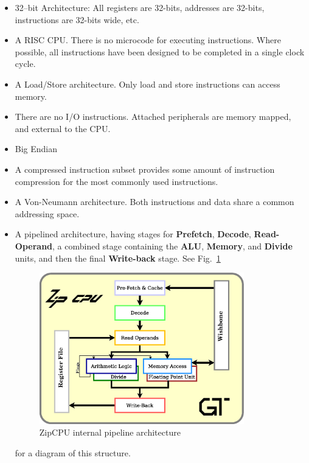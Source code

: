 \documentclass{gqtekspec}
\begin{document}
\begin{itemize}
\item 32--bit Architecture: All registers are 32-bits, addresses are 32-bits,
		instructions are 32-bits wide, etc.

\item A RISC CPU.  There is no microcode for executing instructions.
	Where possible, all instructions have been designed to be completed
	in a single clock cycle.

\item A Load/Store architecture.  Only load and store instructions
	can access memory.

\item There are no I/O instructions.  Attached peripherals are memory
	mapped, and external to the CPU.

\item Big Endian

\item A compressed instruction subset provides some amount of instruction
	compression for the most commonly used instructions.

\item A Von-Neumann architecture.  Both instructions and data share a 
	common addressing space.

\item A pipelined architecture, having stages for {\bf Prefetch},
	{\bf Decode}, {\bf Read-Operand}, a combined stage containing
	the {\bf ALU}, {\bf Memory}, and {\bf Divide} units, and then the
	final {\bf Write-back} stage.  See Fig.~\ref{fig:cpu}
\begin{figure}\begin{center}
\includegraphics[width=3.5in]{../gfx/cpu.eps}
\caption{ZipCPU internal pipeline architecture}\label{fig:cpu}
\end{center}\end{figure}
	for a diagram of this structure.


\end{itemize}
\end{document}
